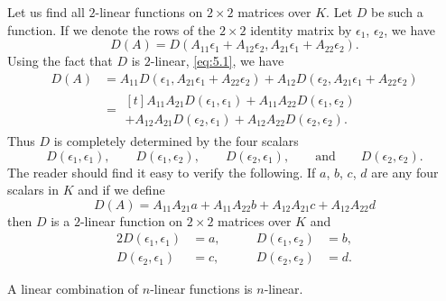 \begin{example}\label{example:5.2}
    Let us find all \(2\)-linear functions on \(2\times2\) matrices over \(K\). Let \(D\) be such a function. If we denote the rows of the \(2\times2\) identity matrix by \(\epsilon_1\), \(\epsilon_2\), we have
    \begin{equation*}
        D\left(A\right)=D\left(A_{11}\epsilon_1+A_{12}\epsilon_2,A_{21}\epsilon_1+A_{22}\epsilon_2\right).
    \end{equation*}
    Using the fact that \(D\) is \(2\)-linear, \eqref{eq:5.1}, we have
    \begin{align*}
        D\left(A\right)&=A_{11}D\left(\epsilon_1,A_{21}\epsilon_1+A_{22}\epsilon_2\right)+A_{12}D\left(\epsilon_2,A_{21}\epsilon_1+A_{22}\epsilon_2\right)\\
        &=
        \begin{multlined}[t]
            A_{11}A_{21}D\left(\epsilon_1,\epsilon_1\right)+A_{11}A_{22}D\left(\epsilon_1,\epsilon_2\right)\\
            +A_{12}A_{21}D\left(\epsilon_2,\epsilon_1\right)+A_{12}A_{22}D\left(\epsilon_2,\epsilon_2\right).
        \end{multlined}
    \end{align*}
    Thus \(D\) is completely determined by the four scalars
    \begin{equation*}
        D\left(\epsilon_1,\epsilon_1\right),\qquad D\left(\epsilon_1,\epsilon_2\right),\qquad D\left(\epsilon_2,\epsilon_1\right),\qquad\text{and}\qquad D\left(\epsilon_2,\epsilon_2\right).
    \end{equation*}
    The reader should find it easy to verify the following. If \(a\), \(b\), \(c\), \(d\) are any four scalars in \(K\) and if we define
    \begin{equation*}
        D\left(A\right)=A_{11}A_{21}a+A_{11}A_{22}b+A_{12}A_{21}c+A_{12}A_{22}d
    \end{equation*}
    then \(D\) is a \(2\)-linear function on \(2\times2\) matrices over \(K\) and
    \begin{alignat*}{2}
        D\left(\epsilon_1,\epsilon_1\right)&=a,\qquad&D\left(\epsilon_1,\epsilon_2\right)&=b,\\
        D\left(\epsilon_2,\epsilon_1\right)&=c,\qquad&D\left(\epsilon_2,\epsilon_2\right)&=d.
    \end{alignat*}
\end{example}

\begin{lemma}
    A linear combination of \(n\)-linear functions is \(n\)-linear.
\end{lemma}

